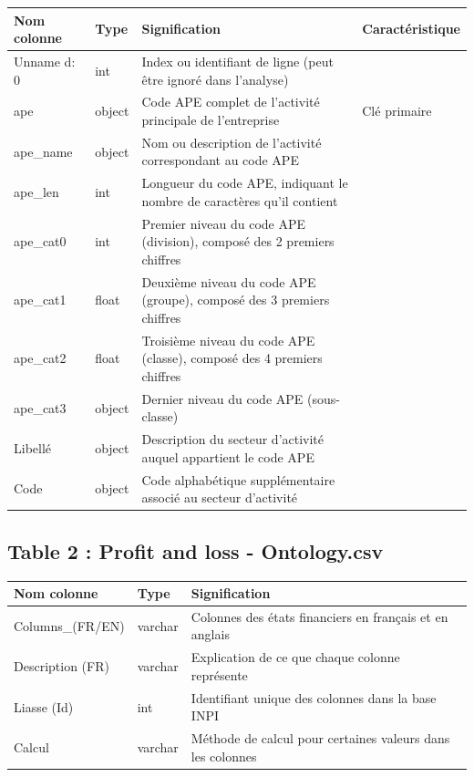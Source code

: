 \documentclass[mstat,12pt]{unswthesis}
\begin{document}
\begin{table}[H]
\centering
\scriptsize
\begin{tabular}{|p{3.2cm}|p{1.2cm}|p{7.5cm}|p{2.5cm}|}
\hline
\textbf{Nom colonne} & \textbf{Type} & \textbf{Signification} & \textbf{Caractéristique} \\
\hline
Unname d: 0 & int & Index ou identifiant de ligne (peut être ignoré dans l'analyse) & \\
\hline
ape & object & Code APE complet de l'activité principale de l'entreprise & Clé primaire \\
\hline
ape\_name & object & Nom ou description de l'activité correspondant au code APE & \\
\hline
ape\_len & int & Longueur du code APE, indiquant le nombre de caractères qu'il contient & \\
\hline
ape\_cat0 & int & Premier niveau du code APE (division), composé des 2 premiers chiffres & \\
\hline
ape\_cat1 & float & Deuxième niveau du code APE (groupe), composé des 3 premiers chiffres & \\
\hline
ape\_cat2 & float & Troisième niveau du code APE (classe), composé des 4 premiers chiffres & \\
\hline
ape\_cat3 & object & Dernier niveau du code APE (sous-classe) & \\
\hline
Libellé & object & Description du secteur d'activité auquel appartient le code APE & \\
\hline
Code & object & Code alphabétique supplémentaire associé au secteur d'activité & \\
\hline
\end{tabular}
\footnotesize
\label{tab:ape_description}
\end{table}

\subsection{Table 2 : Profit and loss -
Ontology.csv}\label{table-2-profit-and-loss---ontology.csv}

\begin{table}[H]
\centering
\scriptsize
\begin{tabular}{|p{4cm}|p{2cm}|p{9cm}|}
\hline
\textbf{Nom colonne} & \textbf{Type} & \textbf{Signification} \\
\hline
Columns\_(FR/EN) & varchar & Colonnes des états financiers en français et en anglais \\
\hline
Description (FR) & varchar & Explication de ce que chaque colonne représente \\
\hline
Liasse (Id) & int & Identifiant unique des colonnes dans la base INPI \\
\hline
Calcul & varchar & Méthode de calcul pour certaines valeurs dans les colonnes \\
\hline
\end{tabular}
\normalsize
\end{table}
\end{document}
